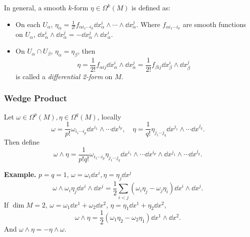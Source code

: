 In general, a smooth \(k\)-form \(\eta\in \Omega^k(M)\) is defined as:
\begin{itemize}
\item On each \(U_\alpha\), \(\eta_\alpha=\frac{1}{2!}f_{\alpha i_1\cdots i_k}
    \dd{x_\alpha^i}\wedge\cdots\wedge\dd{x_\alpha^j}\).
    Where \(f_{\alpha i_1\cdots i_k}\) are smooth functions on \(U_\alpha\),
    \(\dd{x_\alpha^i}\wedge \dd{x_\alpha^j}=-\dd{x_\alpha^j}\wedge\dd{x_\alpha^i}\).
\item On \(U_\alpha\cap U_\beta\), \(\eta_\alpha=\eta_\beta\), then \[
        \eta=\frac{1}{2!}f_{\alpha ij}\dd{x_\alpha^i}\wedge \dd{x_\alpha^j}
        =\frac{1}{2!}f_{\beta ij}\dd{x_\beta^i}\wedge \dd{x_\beta^j}
    \] is called a \emph{differential 2-form} on \(M\).
\end{itemize}

\subsubsection{Wedge Product}
Let \(\omega\in \Omega^p(M),\eta\in \Omega^q(M)\), locally \[
    \omega=\frac{1}{p!}\omega_{i_1\cdots i_p}\dd{x^{i_1}}\wedge \cdots \dd{x^{i_p}},
    \quad\eta=\frac{1}{q!}\eta_{j_1\cdots j_q}\dd{x^{j_1}}\wedge \cdots \dd{x^{j_q}}
.\] Then define \[
    \omega\wedge\eta=\frac{1}{p!q!}\omega_{i_1\cdots i_p}
    \eta_{j_1\cdots j_q}\dd{x^{i_1}}\wedge \cdots \dd{x^{i_p}}\wedge
    \dd{x^{j_1}}\wedge \cdots \dd{x^{j_q}}
.\] 

\noindent\textbf{Example.}
\(p=q=1\), \(\omega=\omega_i\dd{x^i},\eta=\eta_j\dd{x^j}\) \[
    \omega\wedge \omega_i\eta_j\dd{x^i}\wedge\dd{x^j}
    =\frac{1}{2}\sum_{i<j}(\omega_i\eta_j-\omega_j\eta_i)\dd{x^i}\wedge \dd{x^j}
.\] If \(\dim M=2\), \(\omega=\omega_1\dd{x^1}+\omega_2\dd{x^2}\), \(\eta=\eta_1
\dd{x^1}+\eta_2\dd{x^2}\), \[
    \omega\wedge \eta=\frac{1}{2}(\omega_1\eta_2-\omega_2\eta_1)\dd{x^1}\wedge
    \dd{x^2}
.\] And \(\omega\wedge \eta=-\eta\wedge \omega\).

